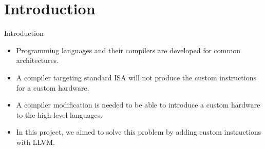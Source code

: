 \section{Introduction}
\begin{frame}{Introduction}
\begin{itemize}
        \item Programming languages and their compilers are developed for common architectures.
        \item A compiler targeting standard ISA will not produce the custom instructions for a custom hardware.
	\item A compiler modification is needed to be able to introduce a custom hardware
to the high-level languages.
	\item In this project, we aimed to solve this problem by adding custom instructions with LLVM.
    \end{itemize}

\end{frame}
